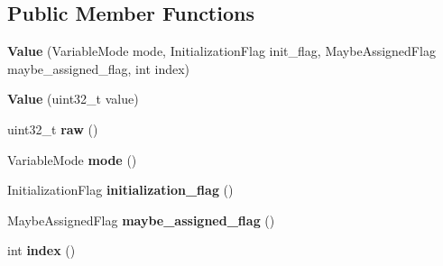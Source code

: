 \subsection*{Public Member Functions}
\begin{DoxyCompactItemize}
\item 
{\bfseries Value} (Variable\+Mode mode, Initialization\+Flag init\+\_\+flag, Maybe\+Assigned\+Flag maybe\+\_\+assigned\+\_\+flag, int index)\hypertarget{structv8_1_1internal_1_1_context_slot_cache_1_1_value_adb7d652b7b91005f10ca78ffbc01da19}{}\label{structv8_1_1internal_1_1_context_slot_cache_1_1_value_adb7d652b7b91005f10ca78ffbc01da19}

\item 
{\bfseries Value} (uint32\+\_\+t value)\hypertarget{structv8_1_1internal_1_1_context_slot_cache_1_1_value_a389303baed592146a08162b0523c0120}{}\label{structv8_1_1internal_1_1_context_slot_cache_1_1_value_a389303baed592146a08162b0523c0120}

\item 
uint32\+\_\+t {\bfseries raw} ()\hypertarget{structv8_1_1internal_1_1_context_slot_cache_1_1_value_adf3a7dcb910c62e6d7ea8560ed8a66ce}{}\label{structv8_1_1internal_1_1_context_slot_cache_1_1_value_adf3a7dcb910c62e6d7ea8560ed8a66ce}

\item 
Variable\+Mode {\bfseries mode} ()\hypertarget{structv8_1_1internal_1_1_context_slot_cache_1_1_value_a370da600dae5e1b1cee605d57ce8c013}{}\label{structv8_1_1internal_1_1_context_slot_cache_1_1_value_a370da600dae5e1b1cee605d57ce8c013}

\item 
Initialization\+Flag {\bfseries initialization\+\_\+flag} ()\hypertarget{structv8_1_1internal_1_1_context_slot_cache_1_1_value_a8a0d9939020730a5b5787b8ce229640c}{}\label{structv8_1_1internal_1_1_context_slot_cache_1_1_value_a8a0d9939020730a5b5787b8ce229640c}

\item 
Maybe\+Assigned\+Flag {\bfseries maybe\+\_\+assigned\+\_\+flag} ()\hypertarget{structv8_1_1internal_1_1_context_slot_cache_1_1_value_a829610144bcb6ff58da92dbeca7e56b3}{}\label{structv8_1_1internal_1_1_context_slot_cache_1_1_value_a829610144bcb6ff58da92dbeca7e56b3}

\item 
int {\bfseries index} ()\hypertarget{structv8_1_1internal_1_1_context_slot_cache_1_1_value_a4a26795650255711a13ee3e593a96bbc}{}\label{structv8_1_1internal_1_1_context_slot_cache_1_1_value_a4a26795650255711a13ee3e593a96bbc}

\end{DoxyCompactItemize}

